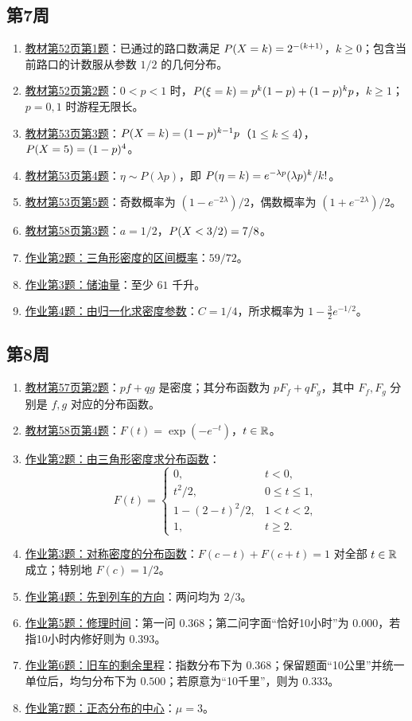 \subsection*{第7周}
\begin{enumerate}
\item \hyperref[ex:w07-b52-1]{教材第52页第1题}：已通过的路口数满足 $\P(X=k)=2^{-(k+1)}$，$k\geq0$；包含当前路口的计数服从参数 $1/2$ 的几何分布。
\item \hyperref[ex:w07-b52-2]{教材第52页第2题}：$0<p<1$ 时，$\P(\xi=k)=p^k(1-p)+(1-p)^kp$，$k\geq1$；$p=0,1$ 时游程无限长。
\item \hyperref[ex:w07-b53-3]{教材第53页第3题}：$\P(X=k)=(1-p)^{k-1}p$（$1\leq k\leq4$），$\P(X=5)=(1-p)^4$。
\item \hyperref[ex:w07-b53-4]{教材第53页第4题}：$\eta\sim P(\lambda p)$，即 $\P(\eta=k)=e^{-\lambda p}(\lambda p)^k/k!$。
\item \hyperref[ex:w07-b53-5]{教材第53页第5题}：奇数概率为 $(1-e^{-2\lambda})/2$，偶数概率为 $(1+e^{-2\lambda})/2$。
\item \hyperref[ex:w07-b58-3]{教材第58页第3题}：$a=1/2$，$\P(X<3/2)=7/8$。
\item \hyperref[ex:w07-h2]{作业第2题：三角形密度的区间概率}：$59/72$。
\item \hyperref[ex:w07-h3]{作业第3题：储油量}：至少 $61$ 千升。
\item \hyperref[ex:w07-h4]{作业第4题：由归一化求密度参数}：$C=1/4$，所求概率为 $1-\tfrac32e^{-1/2}$。
\end{enumerate}
\subsection*{第8周}
\begin{enumerate}
\item \hyperref[ex:w08-b57-2]{教材第57页第2题}：$pf+qg$ 是密度；其分布函数为 $pF_f+qF_g$，其中 $F_f,F_g$ 分别是 $f,g$ 对应的分布函数。
\item \hyperref[ex:w08-b58-4]{教材第58页第4题}：$F(t)=\exp(-e^{-t})$，$t\in\R$。
\item \hyperref[ex:w08-h2]{作业第2题：由三角形密度求分布函数}：\[
F(t)=\begin{cases}0,&t<0,\\t^2/2,&0\leq t\leq1,\\1-(2-t)^2/2,&1<t<2,\\1,&t\geq2.\end{cases}
\]
\item \hyperref[ex:w08-h3]{作业第3题：对称密度的分布函数}：$F(c-t)+F(c+t)=1$ 对全部 $t\in\R$ 成立；特别地 $F(c)=1/2$。
\item \hyperref[ex:w08-h4]{作业第4题：先到列车的方向}：两问均为 $2/3$。
\item \hyperref[ex:w08-h5]{作业第5题：修理时间}：第一问 $0.368$；第二问字面“恰好10小时”为 $0.000$，若指10小时内修好则为 $0.393$。
\item \hyperref[ex:w08-h6]{作业第6题：旧车的剩余里程}：指数分布下为 $0.368$；保留题面“10公里”并统一单位后，均匀分布下为 $0.500$；若原意为“10千里”，则为 $0.333$。
\item \hyperref[ex:w08-h7]{作业第7题：正态分布的中心}：$\mu=3$。
\end{enumerate}
